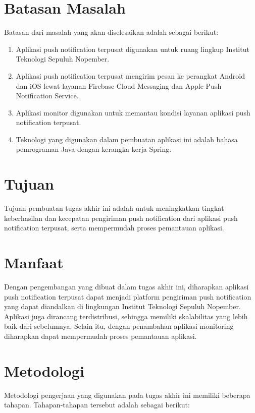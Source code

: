 \section {Batasan Masalah}
Batasan dari masalah yang akan diselesaikan adalah sebagai berikut:
\begin {enumerate}
\item Aplikasi push notification terpusat digunakan untuk ruang lingkup Institut Teknologi Sepuluh Nopember.
\item Aplikasi push notification terpusat mengirim pesan ke perangkat Android dan iOS lewat layanan Firebase Cloud Messaging dan Apple Push Notification Service.
\item Aplikasi monitor digunakan untuk memantau kondisi layanan aplikasi push notification terpusat.
\item Teknologi yang digunakan dalam pembuatan aplikasi ini adalah bahasa pemrograman Java dengan kerangka kerja Spring.
\end {enumerate}

\section {Tujuan}
Tujuan pembuatan tugas akhir ini adalah untuk meningkatkan tingkat keberhasilan dan kecepatan pengiriman push notification dari aplikasi push notification terpusat, serta mempermudah proses pemantauan aplikasi.

\section{Manfaat}
Dengan pengembangan yang dibuat dalam tugas akhir ini, diharapkan aplikasi push notification terpusat dapat menjadi platform pengiriman push notification yang dapat diandalkan di lingkungan Institut Teknologi Sepuluh Nopember. Aplikasi juga dirancang terdistribusi, sehingga memiliki skalabilitas yang lebih baik dari sebelumnya. Selain itu, dengan penambahan aplikasi monitoring diharapkan dapat mempermudah proses pemantauan aplikasi.

\section {Metodologi}
Metodologi pengerjaan yang digunakan pada tugas akhir ini memiliki beberapa tahapan. Tahapan-tahapan tersebut adalah sebagai berikut:

